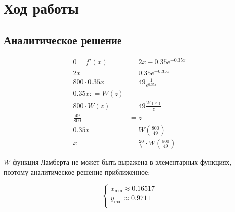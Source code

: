 \section{Ход работы}

\subsection{Аналитическое решение}

\begin{multicols}{2}
    \begin{align*}
        0 = f'(x)        & = 2x - 0.35 e^{ - 0.35x}                          \\
        2x               & = 0.35 e^{ - 0.35x}                               \\
        800 \cdot 0.35 x & = 49 \frac{1}{e^{0.35 x}}                         \\
        0.35 x : = W(z)                                                      \\
        800 \cdot W(z)   & = 49 \frac{W(z)}{z}                               \\
        \frac{49}{800}   & = z                                               \\
        0.35 x           & = W\left(\frac{800}{49}\right)                    \\
        x                & = \frac{20}{7} \cdot W\left(\frac{800}{49}\right)
    \end{align*}

    \(W\)-функция Ламберта не может быть выражена в элементарных функциях, поэтому аналитическое решение приближенное:

    \[\begin{cases}
            x_{\min} \approx 0.16517 \\
            y_{\min} \approx 0.9711  \\
        \end{cases}\]
    \columnbreak

\end{multicols}



